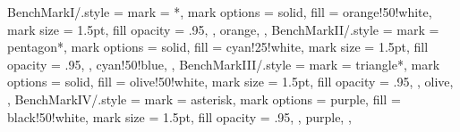 {  %
  BenchMarkI/.style = {
    mark = *,
    mark options = {
      solid,
      fill = orange!50!white,
      mark size = 1.5pt,
      fill opacity = .95,
    },
    orange,
  },
  BenchMarkII/.style = {
    mark = pentagon*,
    mark options = {
      solid,
      fill = cyan!25!white,
      mark size = 1.5pt,
      fill opacity = .95,
    },
    cyan!50!blue,
  },
  BenchMarkIII/.style = {
    mark = triangle*,
    mark options = {
      solid,
      fill = olive!50!white,
      mark size = 1.5pt,
      fill opacity = .95,
    },
    olive,
  },
  BenchMarkIV/.style = {
    mark = asterisk,
    mark options = {
      purple,
      fill = black!50!white,
      mark size = 1.5pt,
      fill opacity = .95,
    },
    purple,
  },
}

